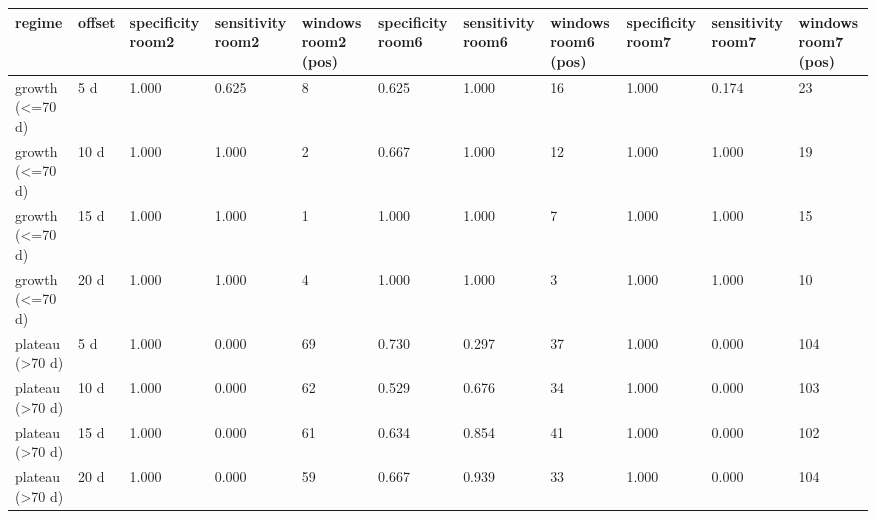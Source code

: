 \begin{tabular}{lllllllllll}
\hline
regime & offset & specificity room2 & sensitivity room2 & windows room2 (pos) & specificity room6 & sensitivity room6 & windows room6 (pos) & specificity room7 & sensitivity room7 & windows room7 (pos) \\
\hline
growth (<=70 d) & 5 d & 1.000 & 0.625 & 8 & 0.625 & 1.000 & 16 & 1.000 & 0.174 & 23 \\
growth (<=70 d) & 10 d & 1.000 & 1.000 & 2 & 0.667 & 1.000 & 12 & 1.000 & 1.000 & 19 \\
growth (<=70 d) & 15 d & 1.000 & 1.000 & 1 & 1.000 & 1.000 & 7 & 1.000 & 1.000 & 15 \\
growth (<=70 d) & 20 d & 1.000 & 1.000 & 4 & 1.000 & 1.000 & 3 & 1.000 & 1.000 & 10 \\
plateau (>70 d) & 5 d & 1.000 & 0.000 & 69 & 0.730 & 0.297 & 37 & 1.000 & 0.000 & 104 \\
plateau (>70 d) & 10 d & 1.000 & 0.000 & 62 & 0.529 & 0.676 & 34 & 1.000 & 0.000 & 103 \\
plateau (>70 d) & 15 d & 1.000 & 0.000 & 61 & 0.634 & 0.854 & 41 & 1.000 & 0.000 & 102 \\
plateau (>70 d) & 20 d & 1.000 & 0.000 & 59 & 0.667 & 0.939 & 33 & 1.000 & 0.000 & 104 \\
\hline
\end{tabular}
